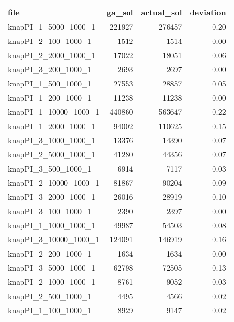 \begin{tabular}{lrrr}
  \toprule
                    file &  ga\_sol &  actual\_sol &  deviation \\
  \midrule
    knapPI\_1\_5000\_1000\_1 &  221927 &      276457 &                  0.20 \\
     knapPI\_2\_100\_1000\_1 &    1512 &        1514 &                  0.00 \\
    knapPI\_2\_2000\_1000\_1 &   17022 &       18051 &                  0.06 \\
     knapPI\_3\_200\_1000\_1 &    2693 &        2697 &                  0.00 \\
     knapPI\_1\_500\_1000\_1 &   27553 &       28857 &                  0.05 \\
     knapPI\_1\_200\_1000\_1 &   11238 &       11238 &                  0.00 \\
   knapPI\_1\_10000\_1000\_1 &  440860 &      563647 &                  0.22 \\
    knapPI\_1\_2000\_1000\_1 &   94002 &      110625 &                  0.15 \\
    knapPI\_3\_1000\_1000\_1 &   13376 &       14390 &                  0.07 \\
    knapPI\_2\_5000\_1000\_1 &   41280 &       44356 &                  0.07 \\
     knapPI\_3\_500\_1000\_1 &    6914 &        7117 &                  0.03 \\
   knapPI\_2\_10000\_1000\_1 &   81867 &       90204 &                  0.09 \\
    knapPI\_3\_2000\_1000\_1 &   26016 &       28919 &                  0.10 \\
     knapPI\_3\_100\_1000\_1 &    2390 &        2397 &                  0.00 \\
    knapPI\_1\_1000\_1000\_1 &   49987 &       54503 &                  0.08 \\
   knapPI\_3\_10000\_1000\_1 &  124091 &      146919 &                  0.16 \\
     knapPI\_2\_200\_1000\_1 &    1634 &        1634 &                  0.00 \\
    knapPI\_3\_5000\_1000\_1 &   62798 &       72505 &                  0.13 \\
    knapPI\_2\_1000\_1000\_1 &    8761 &        9052 &                  0.03 \\
     knapPI\_2\_500\_1000\_1 &    4495 &        4566 &                  0.02 \\
     knapPI\_1\_100\_1000\_1 &    8929 &        9147 &                  0.02 \\
  \bottomrule
  \end{tabular}
  
